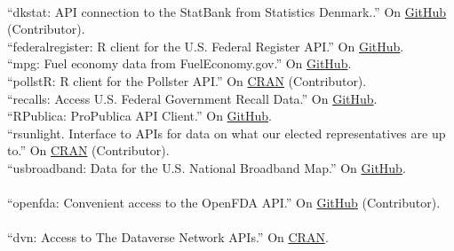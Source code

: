 \documentclass[12pt]{article}
\newcommand{\topic}[1]{\pagebreak[3]\indent {\color{lg}{\footnotesize #1 }}\\}
\newcommand{\entry}[1]{\indent {\color{lg}\guillemotright}\hspace{2pt}#1\vspace{.25em}\\}
\begin{document}
\topic{R packages contributed to the rOpenGov project}
\entry{``dkstat: API connection to the StatBank from Statistics Denmark..'' On \href{https://github.com/rOpenGov/dkstat}{GitHub} (Contributor).}
\entry{``federalregister: R client for the U.S. Federal Register API.'' On \href{https://github.com/rOpenGov/federalregister}{GitHub}.}
\entry{``mpg: Fuel economy data from FuelEconomy.gov.'' On \href{https://github.com/rOpenGov/mpg}{GitHub}.}
\entry{``pollstR: R client for the Pollster API.'' On \href{http://cran.r-project.org/web/packages/pollstR/index.html}{CRAN} (Contributor).}
\entry{``recalls: Access U.S. Federal Government Recall Data.'' On \href{https://github.com/rOpenGov/recalls}{GitHub}.}
\entry{``RPublica: ProPublica API Client.'' On \href{https://github.com/rOpenGov/RPublica}{GitHub}.}
\entry{``rsunlight. Interface to APIs for data on what our elected representatives are up to.'' On \href{http://cran.r-project.org/web/packages/rsunlight/index.html}{CRAN} (Contributor).}
\entry{``usbroadband: Data for the U.S. National Broadband Map.'' On \href{https://github.com/rOpenGov/usbroadband}{GitHub}.}

\topic{R packages contributed to the rOpenHealth project}
\entry{``openfda: Convenient access to the OpenFDA API.'' On \href{https://github.com/ropenhealth/openfda}{GitHub} (Contributor).}

\topic{R packages contributed to the rOpenSci project}
\entry{``dvn: Access to The Dataverse Network APIs.'' On \href{http://cran.r-project.org/web/packages/dvn/index.html}{CRAN}.}
\end{document}
